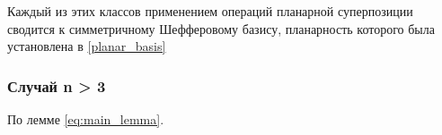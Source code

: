 \documentclass[12pt]{article}
\begin{document}
Каждый из этих классов применением операций планарной суперпозиции сводится к 
симметричному Шефферовому базису, планарность которого была установлена в \ref{planar_basis}

\subsubsection{Случай n > 3}
По лемме \ref{eq:main_lemma}.


\end{document}
